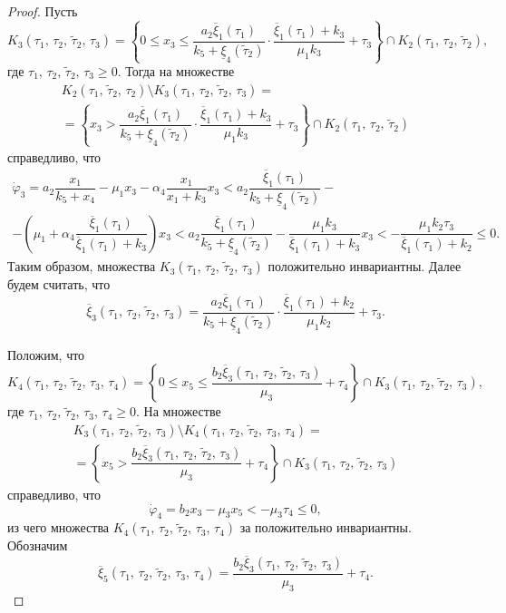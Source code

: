 \documentclass[14pt,a4paper]{extarticle}
\begin{document}
\begin{proof}
		Пусть 
		\[K_3(\tau_1,\,\tau_2,\, \tilde{\tau}_2,\,\tau_3) = \left\{0 \leqslant x_3 \leqslant \dfrac{a_2\overline{\xi}_1(\tau_1)}{k_5+\underline{\xi}_4(\tilde{\tau}_2)}\cdot\dfrac{\overline{\xi}_1(\tau_1)+k_3}{\mu_1k_3}+\tau_3\right\}\cap K_2(\tau_1,\, \tau_2,\, \tilde{\tau}_2),\]
		где $\tau_1,\,\tau_2,\,\tilde{\tau}_2,\,\tau_3 \geqslant 0$. Тогда на множестве 
		\begin{multline*}
			K_2(\tau_1,\, \tilde{\tau}_2,\, \tau_2)\setminus K_3(\tau_1,\,\tau_2,\, \tilde{\tau}_2,\, \tau_3)=\\
			=\left\{x_3 > \dfrac{a_2\overline{\xi}_1(\tau_1)}{k_5+\underline{\xi}_4(\tilde{\tau}_2)}\cdot\dfrac{\overline{\xi}_1(\tau_1)+k_3}{\mu_1k_3}+\tau_3\right\}\cap K_2(\tau_1,\, \tau_2,\, \tilde{\tau}_2)
		\end{multline*}
		справедливо, что
		\begin{multline*}
			\dot{\varphi}_3 = a_2\dfrac{x_1}{k_5+x_4}-\mu_1x_3-\alpha_4\dfrac{x_1}{x_1+k_3}x_3 < a_2\dfrac{\overline{\xi}_1(\tau_1)}{k_5+\underline{\xi}_4(\tilde{\tau}_2)}-\\
			-\left(\mu_1+\alpha_4\dfrac{\overline{\xi}_1(\tau_1)}{\overline{\xi}_1(\tau_1)+k_3}\right) x_3 < a_2\dfrac{\overline{\xi}_1(\tau_1)}{k_5+\underline{\xi}_4(\tilde{\tau}_2)}-\dfrac{\mu_1k_3}{\overline{\xi}_1(\tau_1)+k_3} x_3 < -\dfrac{\mu_1k_2\tau_3}{\overline{\xi}_1(\tau_1)+k_2} \leqslant 0.
		\end{multline*}
		Таким образом, множества $K_3(\tau_1,\,\tau_2,\, \tilde{\tau}_2,\, \tau_3)$ положительно инвариантны. Далее будем считать, что
		\[\overline{\xi}_3(\tau_1,\,\tau_2,\, \tilde{\tau}_2,\, \tau_3) = \dfrac{a_2\overline{\xi}_1(\tau_1)}{k_5+\underline{\xi}_4(\tilde{\tau}_2)}\cdot\dfrac{\overline{\xi}_1(\tau_1)+k_2}{\mu_1k_2} + \tau_3.\]
		
		Положим, что 
		\[K_4(\tau_1,\,\tau_2,\, \tilde{\tau}_2,\, \tau_3,\,\tau_4) = \left\{0 \leqslant x_5 \leqslant \dfrac{b_2\overline{\xi}_3(\tau_1,\,\tau_2,\, \tilde{\tau}_2,\, \tau_3)}{\mu_3}+\tau_4\right\}\cap K_3(\tau_1,\,\tau_2,\, \tilde{\tau}_2,\, \tau_3),\]
		где $\tau_1,\,\tau_2,\, \tilde{\tau}_2,\, \tau_3,\,\tau_4 \geqslant 0$. На множестве 
		\begin{multline*}
			K_3(\tau_1,\,\tau_2,\, \tilde{\tau}_2,\, \tau_3)\setminus K_4(\tau_1,\,\tau_2,\,\tilde{\tau}_2,\,\tau_3,\,\tau_4) =\\
			=\left\{x_5 > \dfrac{b_2\overline{\xi}_3(\tau_1,\,\tau_2,\,\tilde{\tau}_2,\,\tau_3)}{\mu_3}+\tau_4\right\}\cap K_3(\tau_1,\,\tau_2,\, \tilde{\tau}_2,\, \tau_3)
		\end{multline*}
		справедливо, что
		\[\dot{\varphi}_4 = b_2x_3 - \mu_3x_5 < -\mu_3\tau_4 \leqslant 0,\]
		из чего множества $K_4(\tau_1,\,\tau_2,\,\tilde{\tau}_2,\,\tau_3,\,\tau_4)$ за положительно инвариантны. Обозначим
		\[\overline{\xi}_5(\tau_1,\,\tau_2,\,\tilde{\tau}_2,\,\tau_3,\,\tau_4) = \dfrac{b_2\overline{\xi}_3(\tau_1,\,\tau_2,\,\tilde{\tau}_2,\,\tau_3)}{\mu_3}+\tau_4.\]
		

\end{proof}
\end{document}
